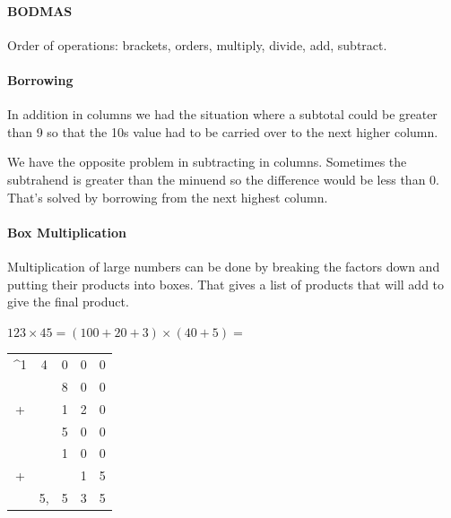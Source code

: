 \documentclass[12pt]{article}
\begin{document}
\paragraph{BODMAS}
Order of operations: brackets, orders, multiply, divide, add, subtract.

\paragraph{Borrowing}
In addition in columns we had the situation where a subtotal could be greater than 9 so that the 10s value had to be carried over to the next higher column.

We have the opposite problem in subtracting in columns. Sometimes the subtrahend is greater than the minuend so the difference would be less than 0. That's solved by borrowing from the next highest column.

\paragraph{Box Multiplication}
Multiplication of large numbers can be done by breaking the factors down and putting their products into boxes. That gives a list of products that will add to give the final product.

$123\times45 = (100 + 20 + 3) \times (40 + 5) =$

\parbox{0.45\textwidth}{
}%
\hfill
\parbox{0.45\textwidth}{
    \centering
    \begin{tabular}{c@{\,}c@{\,}c@{\,}c@{\,}c}
    ^{1}&4&0&0&0\\
        & &8&0&0\\
    + & &1&2&0\\
        & &5&0&0\\
        & &1&0&0\\
    + & & &1&5\\
        \hline
        &5,&5&3&5\\
        \hline
        \hline
    \end{tabular}
}
\end{document}
